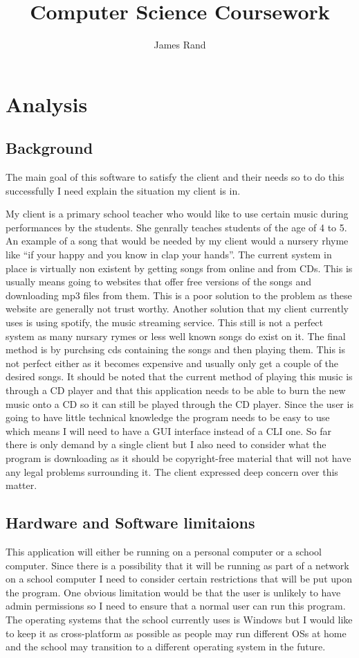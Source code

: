 \documentclass{article}
\title{Computer Science Coursework}
\date{}
\author{James Rand}
\begin{document}
\maketitle
\tableofcontents
\setcounter{tocdepth}{5}
\newpage
\section{Analysis}\label{analysis}
\subsection{Background}\label{background}
The main goal of this software to satisfy the client and their needs so
to do this successfully I need explain the situation my client
is in.

My client is a primary school teacher who would like to
use certain music during performances by the students. She genrally teaches
students of the age of 4 to 5. An example of a
song that would be needed by my client would a nursery rhyme like ``if
your happy and you know in clap your hands''. The current system in
place is virtually non existent by getting songs from online
and from CDs. This is usually means
going to websites that offer free versions of the songs and downloading
mp3 files from them. This is a poor solution to the problem as these website
are generally not trust worthy. Another solution that my client
currently uses is using spotify, the music streaming service. This still
is not a perfect system as many nursary rymes or less well known songs do
exist on it. The final method is by purchsing cds containing the songs
and then playing them. This is not perfect either as it becomes expensive
and usually only get a couple of the desired songs.
It should be noted that the current method of playing this music
is through a CD player and that this application needs to be able to
burn the new music onto a CD so it can still be played through the CD
player.
Since the user is going to have little technical knowledge the program
needs to be easy to use which means I will need to have a GUI interface
instead of a CLI one. So far there is only demand by a single client but
I also need to consider what the program is downloading as it should be
copyright-free material that will not have any legal problems surrounding
it. The client expressed deep concern over this matter.

\subsection{Hardware and Software limitaions}\label{SoftwareAndHardware}
This application will either be running on a personal computer or a school computer.
Since there is a possibility that it will be running as part of a network on a school
computer I need to consider certain restrictions that will be put upon the program.
One obvious limitation would be that the user is unlikely to have admin permissions
so I need to ensure that a normal user can run this program. The operating systems
that the school currently uses is Windows but I would like to keep it as cross-platform
as possible as people may run different OSs at home and the school may transition to
a different operating system in the future.
\end{document}
